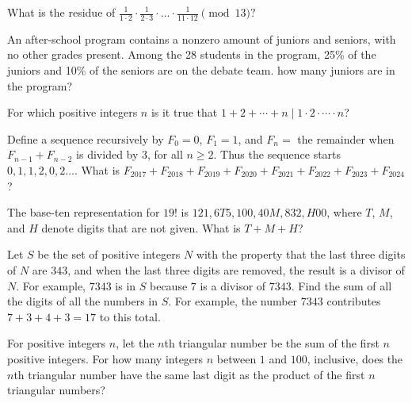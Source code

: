 \documentclass[mast]{lucky}
\begin{document}
\begin{prob}[]{2}
What is the residue of $\frac{1}{1\cdot 2}\cdot \frac{1}{2\cdot 3}\cdot \dots \cdot \frac{1}{11\cdot 12}\pmod {13}?$
\end{prob}

\begin{prob}{2}
An after-school program contains a nonzero amount of juniors and seniors, with no other grades present. Among the 28 students in the program, 25\% of the juniors and 10\% of the seniors are on the debate team. how many juniors are in the program?
\end{prob}

\begin{prob}{3}
For which positive integers $n$ is it true that $1+2+\cdots+n\mid 1\cdot 2\cdot \cdots \cdot n$?
\end{prob}

\begin{prob}[AMC 10A 2017/13]{3}
Define a sequence recursively by $F_0 = 0$, $F_1 = 1$, and $F_n = $ the remainder when $F_{n-1} + F_{n-2}$ is divided by $3$, for all $n \ge 2$. Thus the sequence starts $0,1,1,2,0,2 \ldots$. What is $F_{2017} + F_{2018} + F_{2019} + F_{2020} + F_{2021} + F_{2022} + F_{2023} + F_{2024}$?
\end{prob}

\begin{req}[AMC 10B 2019/14]{4}
The base-ten representation for $19!$ is $121,6T5,100,40M,832,H00$, where $T$, $M$, and $H$ denote digits that are not given. What is $T+M+H$?
\end{req}

\begin{prob}{4}
Let $S$ be the set of positive integers $N$ with the property that the last three digits of $N$ are $343$, and when the last three digits are removed, the result is a divisor of $N$. For example, $7343$ is in $S$ because $7$ is a divisor of $7343$. Find the sum of all the digits of all the numbers in $S$. For example, the number $7343$ contributes $7+3+4+3=17$ to this total.
\end{prob}

\begin{prob}[DMC 10C 2021/17]{4}
    For positive integers $n$, let the $n$th triangular number be the sum of the first $n$ positive integers. For how many integers $n$ between $1$ and $100$, inclusive, does the $n$th triangular number have the same last digit as the product of the first $n$ triangular numbers?
\end{prob}
\end{document}
